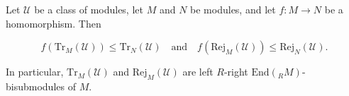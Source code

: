 Let $\mathcal{U}$ be a class of modules, let $M$ and $N$ be modules, and let $f: M \to N$ be a homomorphism. Then

$$f(\mathrm{Tr}_M(\mathcal{U})) \leq \mathrm{Tr}_N(\mathcal{U}) \quad \text{and} \quad f(\mathrm{Rej}_M(\mathcal{U})) \leq \mathrm{Rej}_N(\mathcal{U}).$$

In particular, $\mathrm{Tr}_M(\mathcal{U})$ and $\mathrm{Rej}_M(\mathcal{U})$ are left $R$-right $\mathrm{End}(_R M)$-bisubmodules of $M$.
